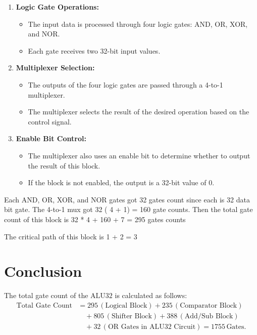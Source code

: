 \documentclass{article}
\begin{document}
\begin{enumerate}
    \item \textbf{Logic Gate Operations:}  
    \begin{itemize}
        \item The input data is processed through four logic gates: AND, OR, XOR, and NOR.
        \item Each gate receives two 32-bit input values.
    \end{itemize}

    \item \textbf{Multiplexer Selection:}  
    \begin{itemize}
        \item The outputs of the four logic gates are passed through a 4-to-1 multiplexer.
        \item The multiplexer selects the result of the desired operation based on the control signal.
    \end{itemize}

    \item \textbf{Enable Bit Control:}  
    \begin{itemize}
        \item The multiplexer also uses an enable bit to determine whether to output the result of this block.
        \item If the block is not enabled, the output is a 32-bit value of \( 0 \).
    \end{itemize}
\end{enumerate}

\hspace{2em}Each AND, OR, XOR, and NOR gates got 32 gates count since each is 32 data bit gate. The 4-to-1 mux got 32 ( 4 + 1) = 160 gate counts. Then the total gate count of this block is 32 * 4 + 160 + 7 = 295 gates counts

\hspace{2em}The critical path of this block is 1 + 2 = 3

\section{Conclusion}
\hspace{2em}The total gate count of the $\text{ALU32}$ is calculated as follows:
\[
\begin{align*}
\text{Total Gate Count} &= 295 \, (\text{Logical Block}) + 235 \, (\text{Comparator Block}) \\
&\quad + 805 \, (\text{Shifter Block}) + 388 \, (\text{Add/Sub Block}) \\
&\quad + 32 \, (\text{OR Gates in ALU32 Circuit}) = 1755 \, \text{Gates}.
\end{align*}
\]
\end{document}
